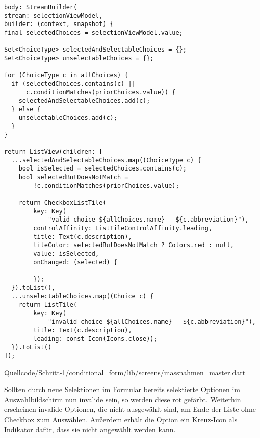 \begin{listing}[htbp]
\ifIncludeFigures
  \renewcommand\theFancyVerbLine{%
    \ifnum\value{FancyVerbLine}=121
    \setcounter{FancyVerbLine}{131}
    \tiny\ldots
    \else
    \tiny\arabic{FancyVerbLine}%
    \fi
  }
  \begin{verbatim}
body: StreamBuilder(
stream: selectionViewModel,
builder: (context, snapshot) {
final selectedChoices = selectionViewModel.value;

Set<ChoiceType> selectedAndSelectableChoices = {};
Set<ChoiceType> unselectableChoices = {};

for (ChoiceType c in allChoices) {
  if (selectedChoices.contains(c) ||
      c.conditionMatches(priorChoices.value)) {
    selectedAndSelectableChoices.add(c);
  } else {
    unselectableChoices.add(c);
  }
}

return ListView(children: [
  ...selectedAndSelectableChoices.map((ChoiceType c) {
    bool isSelected = selectedChoices.contains(c);
    bool selectedButDoesNotMatch =
        !c.conditionMatches(priorChoices.value);

    return CheckboxListTile(
        key: Key(
            "valid choice ${allChoices.name} - ${c.abbreviation}"),
        controlAffinity: ListTileControlAffinity.leading,
        title: Text(c.description),
        tileColor: selectedButDoesNotMatch ? Colors.red : null,
        value: isSelected,
        onChanged: (selected) {

        });
  }).toList(),
  ...unselectableChoices.map((Choice c) {
    return ListTile(
        key: Key(
            "invalid choice ${allChoices.name} - ${c.abbreviation}"),
        title: Text(c.description),
        leading: const Icon(Icons.close));
  }).toList()
]);
\end{verbatim}
\fi
   {Quellcode/Schritt-1/conditional_form/lib/screens/massnahmen_master.dart}
  \label{lst:Schritt4selectedAndSelectableChoices}
\end{listing}









Sollten durch neue Selektionen im Formular bereits selektierte Optionen im Auswahlbildschirm nun invalide sein,
so werden diese rot gefärbt.
Weiterhin erscheinen invalide Optionen,
die nicht ausgewählt sind,
am Ende der Liste ohne Checkbox zum Auswählen.
Außerdem erhält die Option ein Kreuz-Icon als Indikator dafür,
dass sie nicht angewählt werden kann.

